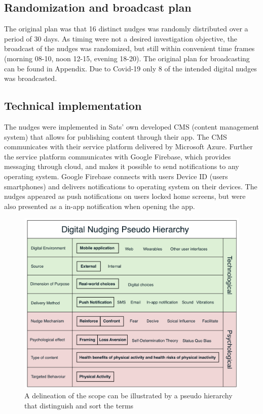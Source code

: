 \subsection{Randomization and broadcast plan}
The original plan was that 16 distinct nudges was randomly distributed over a period of 30 days. As timing were not a desired investigation objective, the broadcast of the nudges was randomized, but still within convenient time frames (morning 08-10, noon 12-15, evening 18-20). The original plan for broadcasting can be found in Appendix. Due to Covid-19 only 8 of the intended digital nudges was broadcasted. 

\subsection{Technical implementation}
The nudges were implemented in Sats' own developed CMS (content management system) that allows for publishing content through their app. The CMS communicates with their service platform delivered by Microsoft Azure. Further the service platform communicates with Google Firebase, which provides messaging through cloud, and makes it possible to send notifications to any operating system. Google Firebase connects with users Device ID (users smartphones) and delivers notifications to operating system on their devices. The nudges appeared as push notifications on users locked home screens, but were also presented as a in-app notification when opening the app. 


\bigbreak
\bigbreak
\begin{figure}[ht]
\includegraphics[width=1\textwidth]{images/Nudge.png}
\caption{A delineation of the scope can be illustrated by a pseudo hierarchy that distinguish and sort the terms}
\end{figure}
\bigbreak
\bigbreak
